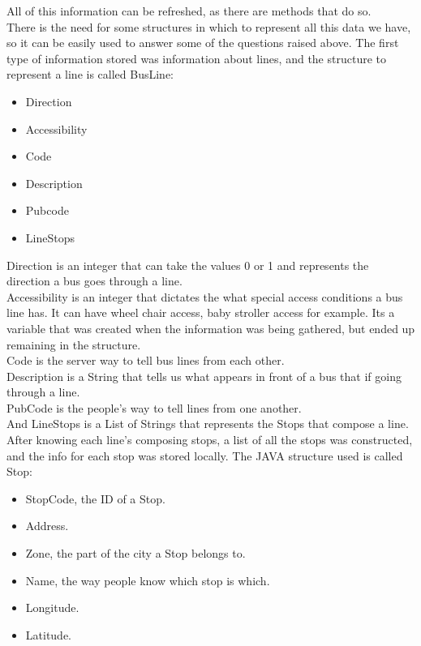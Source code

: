 \documentclass[12pt]{article}
\begin{document}
\begin{multicols}{2}
All of this information can be refreshed, as there are methods that do so.\\

There is the need for some structures in which to represent all this data we have, so it can be easily used to answer some of the questions raised above. The first type of information stored was information about lines, and the structure to represent a line is called BusLine:
\begin{itemize}
\item Direction
\item Accessibility
\item Code
\item Description
\item Pubcode
\item LineStops
\end{itemize}
Direction is an integer that can take the values 0 or 1 and represents the direction a bus goes through a line.\\
Accessibility is an integer that dictates the what special access conditions a bus line has. It can have wheel chair access, baby stroller access for example. Its a variable that was created when the information was being gathered, but ended up remaining in the structure.\\
Code is the server way to tell bus lines from each other.\\
Description is a String that tells us what appears in front of a bus that if going through a line.\\
PubCode is the people's way to tell lines from one another.\\
And LineStops is a List of Strings that represents the Stops that compose a line.\\

After knowing each line's composing stops, a list of all the stops was constructed, and the info for each stop was stored locally. The JAVA structure used is called Stop:
\begin{itemize}
	\item StopCode, the ID of a Stop.
	\item Address.
	\item Zone, the part of the city a Stop belongs to.
	\item Name, the way people know which stop is which.
	\item Longitude.
	\item Latitude.
\end{itemize}


\end{multicols}
\end{document}

